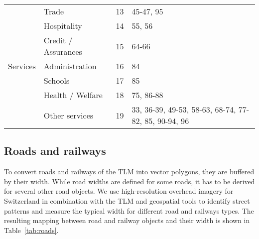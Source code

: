 \begin{table}[ht]
{\begin{tabular}{llll}
\multirow{7}{*}{Services}  & Trade                      & 13                           & 45-47, 95                                            \\
                           & Hospitality                & 14                           & 55, 56                                               \\
                           & Credit / Assurances        & 15                           & 64-66                                                \\
                           & Administration             & 16                           & 84                                                   \\
                           & Schools                    & 17                           & 85                                                   \\
                           & Health / Welfare           & 18                           & 75, 86-88                                            \\
                           & Other services             & 19                           & 33, 36-39, 49-53, 58-63, 68-74, 77-82, 85, 90-94, 96 \\ \hline
\end{tabular}%
}
\end{table}

\subsection*{Roads and railways}
\label{app:roads}

To convert roads and railways of the TLM into vector polygons, they are buffered by their width. While road widths are defined for some roads, it has to be derived for several other road objects. We use high-resolution overhead imagery for Switzerland in combination with the TLM and geospatial tools to identify street patterns and measure the typical width for different road and railways types. The resulting mapping between road and railway objects and their width is shown in Table~\ref{tab:roads}.  

